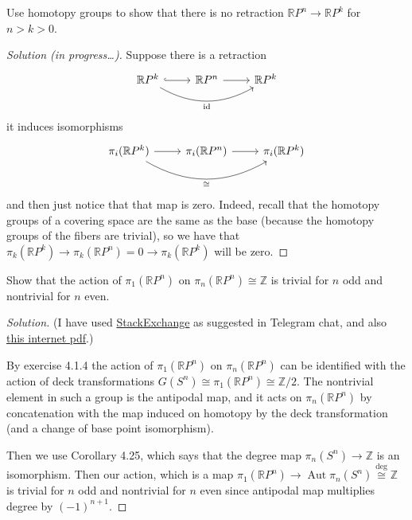 \documentclass{article}
\numberwithin{equation}{section}
\newcommand{\R}{\mathbb{R}}
\newcommand{\Z}{\mathbb{Z}}
\DeclareMathOperator{\id}{id}
\begin{document}
\begin{exercise}[4.2.1]
	Use homotopy groups to show that there is no retraction $\R P^n\to \R P^k$ for $n>k>0$.
\end{exercise}
\begin{proof}[Solution (in progress…)]
	Suppose there is a retraction
	\[\begin{tikzcd}
		\R P^k\arrow[r,hook]\arrow[rr,bend right,swap,"\id"]&\R P^n\arrow[r]&\R P^k
	\end{tikzcd}\]
	it induces isomorphisms
	\[\begin{tikzcd}
		\pi_i(\R P^k)\arrow[r]\arrow[rr,bend right,swap,"\cong"]&\pi_i(\R P^n)\arrow[r]&\pi_i(\R P^k)
	\end{tikzcd}\]
	and then just notice that that map is zero. Indeed, recall that the homotopy groups of a covering space are the same as the base (because the homotopy groups of the fibers are trivial), so we have that $\pi_k(\R P^k)\to\pi_k(\R P^n)=0\to\pi_k(\R P^k)$ will be zero. 
\end{proof}

\begin{exercise}[4.2.2]
	Show that the action of $\pi_1(\R P^n)$ on $\pi_n(\R P^n)\cong\Z$ is trivial for $n$ odd and nontrivial for $n$ even.
\end{exercise}
\begin{proof}[Solution]
	(I have used \href{https://math.stackexchange.com/questions/375968/the-action-of-the-group-of-deck-transformation-on-the-higher-homotopy-groups}{StackExchange} as suggested in Telegram chat, and also \href{https://pages.uoregon.edu/njp/hw7solutions.pdf}{this internet pdf}.)

	By exercise 4.1.4 the action of $\pi_{1}(\mathbb{R}P^{n})$ on $\pi_{n}(\mathbb{R}P^{n})$ can be identified with the action of deck transformations $G(S^{n})\cong \pi_{1}(\mathbb{R}P^{n})\cong \Z/2$. The nontrivial element in such a group is the antipodal map, and it acts on $\pi_{n}(\mathbb{R}P^{n})$ by concatenation with the map induced on homotopy by the deck transformation (and a change of base point isomorphism).

	Then we use Corollary 4.25, which says that the degree map $\pi_{n}(S^{n})\to\Z$ is an isomorphism. Then our action, which is a map $\pi_{1}(\mathbb{R}P^{n})\to \operatorname{Aut}\pi_{n}(S^{n})\overset{\operatorname{deg}}{\cong } \mathbb{Z}$ is trivial for $n$ odd and nontrivial for $n$ even since antipodal map multiplies degree by $(-1)^{n+1}$.
\end{proof}
\end{document}

